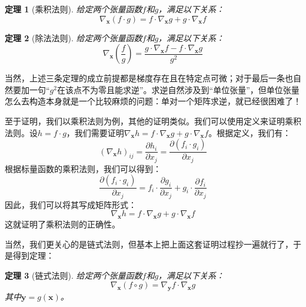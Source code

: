 \documentclass[
    UTF8,
    a4paper,
    12pt
]{ctexart}
\newtheorem{theorem}{定理}
\begin{document}
\begin{theorem}[乘积法则]
    给定两个张量函数$f$和$g$，满足以下关系：
    \begin{equation}
        \nabla_\mathbf{x} (f \cdot g) = f \cdot \nabla_\mathbf{x} g + g \cdot \nabla_\mathbf{x} f
    \end{equation}
\end{theorem}

\begin{theorem}[除法法则]
    给定两个张量函数$f$和$g$，满足以下关系：
    \begin{equation}
        \nabla_\mathbf{x} \left( \frac{f}{g} \right) = \frac{g \cdot \nabla_\mathbf{x} f - f \cdot \nabla_\mathbf{x} g}{g^2}
    \end{equation}
\end{theorem}

当然，上述三条定理的成立前提都是梯度存在且在特定点可微；对于最后一条也自然要加一句“$g^2$在该点不为零且能求逆”。求逆自然涉及到“单位张量”，但单位张量怎么去构造本身就是一个比较麻烦的问题：单对一个矩阵求逆，就已经很困难了！

至于证明，我们以乘积法则为例，其他的证明类似。我们可以使用定义来证明乘积法则。设$h = f \cdot g$，我们需要证明$\nabla_\mathbf{x} h = f \cdot \nabla_\mathbf{x} g + g \cdot \nabla_\mathbf{x} f$。根据定义，我们有：
\begin{equation}
    (\nabla_\mathbf{x} h)_{ij} = \frac{\partial h_i}{\partial x_j} = \frac{\partial (f_i \cdot g_i)}{\partial x_j}
\end{equation}
根据标量函数的乘积法则，我们可以得到：
\begin{equation}
    \frac{\partial (f_i \cdot g_i)}{\partial x_j} = f_i \cdot \frac{\partial g_i}{\partial x_j} + g_i \cdot \frac{\partial f_i}{\partial x_j}
\end{equation}
因此，我们可以将其写成矩阵形式：
\begin{equation}
    \nabla_\mathbf{x} h = f \cdot \nabla_\mathbf{x} g + g \cdot \nabla_\mathbf{x} f
\end{equation}
这就证明了乘积法则的正确性。

当然，我们更关心的是链式法则，但基本上把上面这套证明过程抄一遍就行了，于是得到定理：
\begin{theorem}[链式法则]
    给定两个张量函数$f$和$g$，满足以下关系：
    \begin{equation}
        \nabla_\mathbf{x} (f \circ g) = \nabla_\mathbf{y} f \cdot \nabla_\mathbf{x} g
    \end{equation}
    其中$\mathbf{y} = g(\mathbf{x})$。
\end{theorem}
\end{document}
